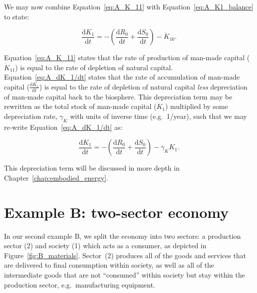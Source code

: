 We may now combine Equation~\ref{eq:A_K_11} with
Equation~\ref{eq:A_K1_balance} to state:

\begin{equation}
\label{eq:A_dK_1/dt}
	\frac{\mathrm{d}K_{1}}{\mathrm{d}t}
	= - \left(
	\frac{\mathrm{d}R_0}{\mathrm{d}t}		
	+	\frac{\mathrm{d}S_0}{\mathrm{d}t}
	\right)
	- \dot{K}_{10}.
\end{equation}

Equation~\ref{eq:A_K_11} states that the rate of production of man-made capital
($\dot{K}_{11}$) is equal to the rate of depletion of natural capital. 
Equation~\ref{eq:A_dK_1/dt} states that the rate of accumulation of man-made capital
($\frac{\mathrm{d}K_{1}}{\mathrm{d}t}$) is equal to the rate of depletion of natural
capital \emph{less} depreciation of man-made capital back to the biosphere.
This depreciation term may be rewritten as the total stock
of man-made capital ($\dot{K}_{1}$) 
multiplied by some depreciation rate, $\gamma_{K}$ with units of
inverse time (e.g.\ 1/year), such that we may re-write
Equation~\ref{eq:A_dK_1/dt} as:

\begin{equation}
\label{eq:A_dK_1/dt_b}
	\frac{\mathrm{d}K_{1}}{\mathrm{d}t}
	= - \left(
	\frac{\mathrm{d}R_0}{\mathrm{d}t}		
	+	\frac{\mathrm{d}S_0}{\mathrm{d}t}
	\right)
	- \gamma_{K}K_{1}.
\end{equation}

This depreciation term will be discussed in more depth in
Chapter~\ref{chap:embodied_energy}.

\section{Example B: two-sector economy} %
\label{sec:B_materials}

In our second example B, we split the economy into two sectors: 
a production sector (2) and society (1) which acts as a consumer, 
as depicted in Figure~\ref{fig:B_materials}. 
Sector~(2) produces all of the goods and services 
that are delivered to final consumption within society, 
as well as all of the intermediate goods that are not ``consumed'' 
within society but stay within the production sector, e.g.\ manufacturing equipment.

